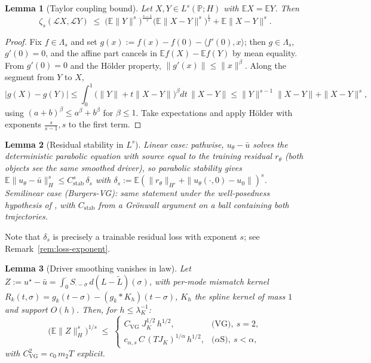 \documentclass[review,12pt]{elsarticle}
\newtheorem{lemma}{Lemma}
\begin{document}
\begin{lemma}[Taylor coupling bound]\label{lem:zeta-coupling}
Let $X, Y \in L^s(\mathbb P; H)$ with $\mathbb EX = \mathbb EY$. Then
\[
\zeta_s(\mathcal L X, \mathcal L Y) \;\le\;
\bigl(\mathbb E\|Y\|^s\bigr)^{\frac{s-1}{s}}
\bigl(\mathbb E\|X-Y\|^s\bigr)^{\frac 1s}
+ \mathbb E\|X-Y\|^s.
\]
\end{lemma}

\begin{proof}
Fix $f \in \Lambda_s$ and set
$g(x) := f(x) - f(0) - \langle f'(0), x\rangle$; then $g \in
\Lambda_s$, $g'(0) = 0$, and the affine part cancels in
$\mathbb E f(X) - \mathbb E f(Y)$ by mean equality. From $g'(0) = 0$
and the H\"older property, $\|g'(x)\| \le \|x\|^\beta$. Along the
segment from $Y$ to $X$,
\[
|g(X) - g(Y)| \le \int_0^1
\bigl(\|Y\| + t\|X-Y\|\bigr)^\beta dt\,\|X-Y\|
\le \|Y\|^{s-1}\|X-Y\| + \|X-Y\|^s,
\]
using $(a+b)^\beta \le a^\beta + b^\beta$ for $\beta \le 1$. Take
expectations and apply H\"older with exponents
$\tfrac{s}{s-1}, s$ to the first term.
\end{proof}

\begin{lemma}[Residual stability in $L^s$]\label{lem:ls-stability}
Linear case: pathwise, $u_\theta - \bar u$ solves the deterministic
parabolic equation with source equal to the training residual
$r_\theta$ (both objects see the same smoothed driver), so parabolic
stability gives
$\mathbb E\|u_\theta - \bar u\|_H^s \le C_{\mathrm{stab}}^s\,\delta_s$
with $\delta_s := \mathbb E(\|r_\theta\|_{H'} +
\|u_\theta(\cdot,0) - u_0\|)^s$. Semilinear case (Burgers-VG): same
statement under the well-posedness hypothesis of
\cite[Thm.~3.4]{MishraMolinaro2022}, with $C_{\mathrm{stab}}$ from a
Gr\"onwall argument on a ball containing both trajectories.
\end{lemma}

Note that $\delta_s$ is precisely a trainable residual loss with
exponent $s$; see Remark~\ref{rem:loss-exponent}.

\begin{lemma}[Driver smoothing vanishes in law]\label{lem:smoothing-law}
Let $Z := u^\star - \bar u = \int_0^\cdot S_{\cdot - \sigma}\,
d(L - \tilde L)(\sigma)$, with per-mode mismatch kernel
$R_k(t,\sigma) = g_k(t-\sigma) - (g_k * K_h)(t-\sigma)$, $K_h$ the
spline kernel of mass $1$ and support $O(h)$. Then, for
$h \le \lambda_K^{-1}$:
\[
\bigl(\mathbb E\|Z\|_H^s\bigr)^{1/s} \;\le\;
\begin{cases}
C_{\mathrm{VG}}\; J_K^{1/2}\, h^{1/2}, & \text{(VG)},\ s = 2,\\[3pt]
c_{\alpha,s}\, C\,(T J_K)^{1/\alpha}\, h^{1/2}, &
\text{($\alpha$S)},\ s < \alpha,
\end{cases}
\]
with $C_{\mathrm{VG}}^2 = c_0\, m_2 T$ explicit.
\end{lemma}
\end{document}
